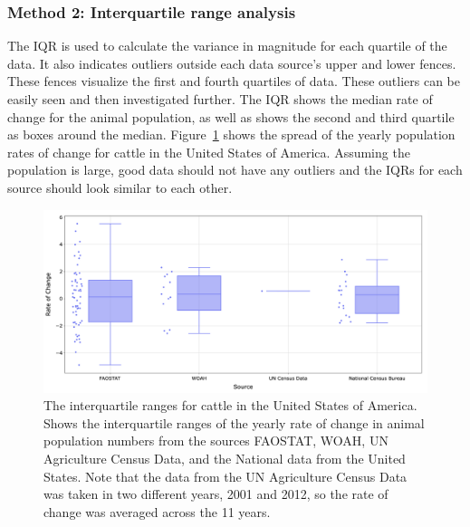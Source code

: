 \documentclass{article}
\begin{document}
\subsubsection{Method 2: Interquartile range analysis}
The IQR is used to calculate the variance in magnitude for each quartile of the data. It also indicates outliers outside each data source's upper and lower fences. These fences visualize the first and fourth quartiles of data. These outliers can be easily seen and then investigated further. The IQR shows the median rate of change for the animal population, as well as shows the second and third quartile as boxes around the median. Figure~\ref{fig:image6} shows the spread of the yearly population rates of change for cattle in the United States of America. Assuming the population is large, good data should not have any outliers and the IQRs for each source should look similar to each other. 

\begin{figure}[h!]
    \centering
    \includegraphics[width=1\textwidth]{image6}
    \caption{The interquartile ranges for cattle in the United States of America. Shows the interquartile ranges of the yearly rate of change in animal population numbers from the sources FAOSTAT, WOAH, UN Agriculture Census Data, and the National data from the United States. Note that the data from the UN Agriculture Census Data was taken in two different years, 2001 and 2012, so the rate of change was averaged across the 11 years. }
    \label{fig:image6}
\end{figure}
\end{document}
